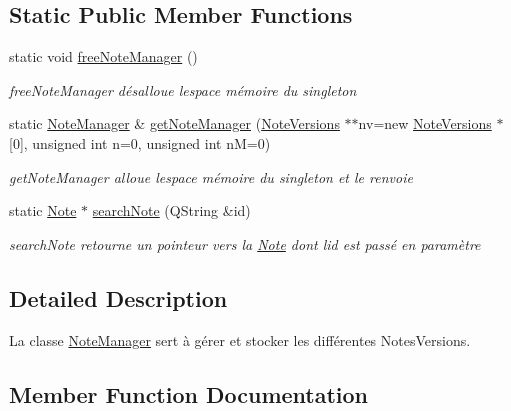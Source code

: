 \subsection*{Static Public Member Functions}
\begin{DoxyCompactItemize}
\item 
\mbox{\label{classNoteManager_a3390485b8367f6405417893fdf643d5e}} 
static void \hyperlink{classNoteManager_a3390485b8367f6405417893fdf643d5e}{free\+Note\+Manager} ()
\begin{DoxyCompactList}\small\item\em free\+Note\+Manager désalloue l\textquotesingle{}espace mémoire du singleton \end{DoxyCompactList}\item 
static \hyperlink{classNoteManager}{Note\+Manager} \& \hyperlink{classNoteManager_a3bfcec9380fa00d216be61126e2a9459}{get\+Note\+Manager} (\hyperlink{classNoteVersions}{Note\+Versions} $\ast$$\ast$nv=new \hyperlink{classNoteVersions}{Note\+Versions} $\ast$\mbox{[}0\mbox{]}, unsigned int n=0, unsigned int nM=0)
\begin{DoxyCompactList}\small\item\em get\+Note\+Manager alloue l\textquotesingle{}espace mémoire du singleton et le renvoie \end{DoxyCompactList}\item 
static \hyperlink{classNote}{Note} $\ast$ \hyperlink{classNoteManager_a4326fc99844021381e66451d951cb079}{search\+Note} (Q\+String \&id)
\begin{DoxyCompactList}\small\item\em search\+Note retourne un pointeur vers la \hyperlink{classNote}{Note} dont l\textquotesingle{}id est passé en paramètre \end{DoxyCompactList}\end{DoxyCompactItemize}


\subsection{Detailed Description}
La classe \hyperlink{classNoteManager}{Note\+Manager} sert à gérer et stocker les différentes Notes\+Versions. 

\subsection{Member Function Documentation}
\mbox{\label{classNoteManager_a69d289844606be132d3c76f5f49128b9}} 
